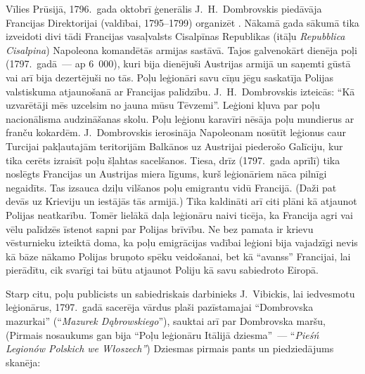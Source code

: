 \documentclass[twoside,a5paper,12pt,fleqn,openany]{extbook}
\newcommand{\pltxti}[1]{\textit{\textpolish{#1}}}
\newcommand{\latxti}[1]{\textit{\textlatin{#1}}}
\begin{document}
Vīlies Prūsijā, 1796.~gada oktobrī ģenerālis J.~H.~Dombrovskis piedāvāja Francijas Direktorijai (valdībai, 1795--1799) organizēt . Nākamā gada sākumā tika izveidoti divi tādi Francijas vasaļvalsts Cisalpīnas Republikas (itāļu \latxti{Repubblica Cisalpina}) Napoleona komandētās armijas sastāvā. Tajos galvenokārt dienēja poļi (1797.~gadā~--- ap 6~000), kuri bija dienējuši Austrijas armijā un saņemti gūstā vai arī bija dezertējuši no tās. Poļu leģionāri savu cīņu jēgu saskatīja Polijas valstiskuma atjaunošanā ar Francijas palīdzību. J.~H.~Dombrovskis izteicās: ``Kā uzvarētāji mēs uzcelsim no jauna mūsu Tēvzemi''. Leģioni kļuva par poļu nacionālisma audzināšanas skolu. Poļu leģionu karavīri nēsāja poļu mundierus ar franču kokardēm. J.~Dombrovskis ierosināja Napoleonam nosūtīt leģionus caur Turcijai pakļautajām teritorijām Balkānos uz Austrijai piederošo Galīciju, kur tika cerēts izraisīt poļu šļahtas sacelšanos. Tiesa, drīz (1797.~gada aprīlī) tika noslēgts Francijas un Austrijas miera līgums, kurš leģionāriem nāca pilnīgi negaidīts. Tas izsauca dziļu vilšanos poļu emigrantu vidū Francijā. (Daži pat devās uz Krieviju un iestājās tās armijā.) Tika kaldināti arī citi plāni kā atjaunot Polijas neatkarību. Tomēr lielākā daļa leģionāru naivi ticēja, ka Francija agri vai vēlu palīdzēs īstenot sapni par Polijas brīvību. Ne bez pamata ir krievu vēsturnieku izteiktā doma, ka poļu emigrācijas vadībai leģioni bija vajadzīgi nevis kā bāze nākamo Polijas bruņoto spēku veidošanai, bet kā ``avanss'' Francijai, lai pierādītu, cik svarīgi tai būtu atjaunot Poliju kā savu sabiedroto Eiropā.

Starp citu, poļu publicists un sabiedriskais darbinieks J.~Vibickis, lai iedvesmotu leģionārus, 1797.~gadā sacerēja vārdus plaši pazīstamajai ``Dombrovska mazurkai'' (``\pltxti{Mazurek Dąbrowskiego}''), sauktai arī par Dombrovska maršu, (Pirmais nosaukums gan bija ``Poļu leģionāru Itālijā dziesma''~--- ``\pltxti{Pieśń Legionów Polskich we Włoszech''}) Dziesmas pirmais pants un piedziedājums skanēja:

\vspace{1.5em}
\end{document}
